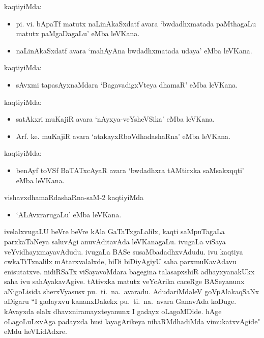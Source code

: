 \newpage

 kaqtiyiMda:
\begin{itemize}
\itemsep=0pt
\item[\eng{1.}] pi. vi. bApaTf matutx naLinAkaSxdatf avara `bwdadhxmatada paMthagaLu matutx paMgaDagaLu' eMba leVKana.

\item[\eng{2.}] naLinAkaSxdatf avara `mahAyAna bwdadhxmatada udaya' eMba leVKana.
\end{itemize}

 kaqtiyiMda:
\begin{itemize}
\item[\eng{1.}] sAvxmi tapasAyxnaMdara `BagavadigxVteya dhamaR' eMba leVKana.
\end{itemize}

 kaqtiyiMda:
\begin{itemize}
\itemsep=0pt
\item[\eng{1.}] satAkxri muKajiR avara `nAyxya-veYsheVSika' eMba leVKana.

\item[\eng{2.}] Arf. ke. muKajiR avara `atakayxRboVdhadashaRna' eMba leVKana.
\end{itemize}

 kaqtiyiMda:
\begin{itemize}
\item[\eng{1.}] benAyf toVSf BaTATxcAyaR avara `bwdadhxra tAMtirxka saMsakxqqti' eMba leVKana.
\end{itemize}

 vishavxdhamaRdashaRna-saM-2 kaqtiyiMda
\begin{itemize}
\item[\eng{1.}] `ALAvxrarugaLu' eMba leVKana.
\end{itemize}

ivelalxvugaLU beVre beVre kAla GaTaTxgaLalilx, kaqti saMpuTagaLa parxkaTaNeya saluvAgi anuvAditavAda leVKanagaLu. ivugaLa viSaya veYvidhayxmayavAdudu. ivugaLa BASe susaMbadadhxvAdudu. ivu kaqtiya cwkaTiTxnalilx mAtarxvalalxde, biDi biDiyAgiyU saha parxmuKavAdavu enisutatxve. nidiRSaTx viSayavoMdara bagegina talasapxshiR adhayxyanakUkx saha ivu sahAyakavAgive. tAtivxka matutx veYcArika caceRge BASeyanunx aNigoLisida sherxVyasusx pu.~ti.~na.~avaradu. AdudariMdaleV goVpAlakaqSaNx aDigaru ``I gadayxvu kananxDakekx pu.~ti.~na.~avara GanavAda koDuge. kAvayxda elalx dhavxniramayxteyanunx I gadayx oLagoMDide. hAge oLagoLuLxvAga padayxda husi layagArikeya nibaRMdhadiMda vimukatxvAgide" eMdu heVLidAdxre.

